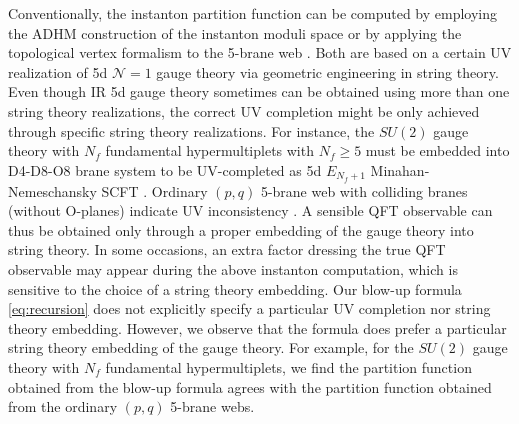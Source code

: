 \documentclass[letterpaper, 11pt]{article}
\begin{document}
{Conventionally, the instanton partition function can be computed by employing the ADHM construction of the instanton moduli space \cite{Atiyah:1978ri,Nekrasov:2002qd,Nekrasov:2003rj} or by applying the topological vertex formalism to the 5-brane web \cite{Aganagic:2003db,Iqbal:2007ii}. Both are based on a certain UV realization of 5d $\mathcal{N}=1$ gauge theory via geometric engineering in string theory. 
Even though IR 5d gauge theory sometimes can be obtained using more than one string theory realizations, the correct UV completion might be only achieved through specific string theory realizations. For instance, the $SU(2)$ gauge theory with $N_f$ fundamental hypermultiplets with $N_f\geq 5$ must be embedded into D4-D8-O8 brane system to be UV-completed as 5d $E_{N_f+1}$ Minahan-Nemeschansky SCFT \cite{Seiberg:1996bd, Minahan:1996fg, Minahan:1996cj}. Ordinary $(p,q)$ 5-brane web with colliding branes (without O-planes) indicate UV inconsistency \cite{Aharony:1997ju}. 
A sensible QFT observable can thus be obtained only through a proper embedding of the gauge theory into string theory. In some occasions, an extra factor dressing the true QFT observable may appear during the above instanton computation, which is sensitive to the choice of a string theory embedding.
Our blow-up formula \eqref{eq:recursion} does not explicitly specify a particular UV completion nor string theory embedding. However, we observe that the formula does prefer a particular string theory embedding of the gauge theory. For example, for the $SU(2)$ gauge theory with $N_f$ fundamental hypermultiplets, we find the partition function obtained from the blow-up formula agrees with the partition function obtained from the ordinary $(p,q)$ 5-brane webs. 

}
\end{document}
